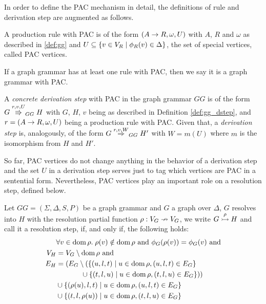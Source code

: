 \documentclass[]{report}
\begin{document}
In order to define the PAC mechanism in detail, the definitions of rule and derivation step are augmented as follows.

\begin{definition}
	A production rule with PAC is of the form $(A \to R, \omega, U)$ with $A$, $R$ and $\omega$ as described in \ref{def:gg} and $U \subseteq \{v \in V_R \; | \; \phi_R(v) \in \Delta\}$, the set of special vertices, called PAC vertices.
\end{definition}

If a graph grammar has at least one rule with PAC, then we say it is a graph grammar with PAC.

\begin{definition}
	A \textit{concrete derivation step} with PAC in the graph grammar $GG$ is of the form $G \overset{r,v,U}{\Rrightarrow}_{GG} H$ with $G$, $H$, $v$ being as described in Definition \ref{def:gg_dstep}, and $r = (A \to R, \omega, U)$ being a production rule with PAC. Given that, a \textit{derivation step} is, analogously, of the form $G \overset{r,v,W}{\Rightarrow}_{GG} H'$ with $W = m(U)$ where $m$ is the isomorphism from $H$ and $H'$.
\end{definition}

So far, PAC vertices do not change anything in the behavior of a derivation step and the set $U$ in a derivation step serves just to tag which vertices are PAC in a sentential form. Nevertheless, PAC vertices play an important role on a resolution step, defined below.

\begin{definition}
	Let $GG = (\Sigma, \Delta, S, P)$ be a graph grammar and $G$ a graph over $\Delta$, $G$ resolves into $H$ with the resolution partial function $\rho: V_G \nrightarrow V_G$, we write $G \overset{\rho}{\rightarrowtail} H$ and call it a resolution step, if, and only if, the following holds:
	\begin{align*}
		& \forall v \in \operatorname{dom} \rho . \; \rho(v) \notin \operatorname{dom} \rho \text{ and } \phi_G(\rho(v)) = \phi_G(v) \text{ and}\\
		V_H & = V_G \setminus \operatorname{dom} \rho \text{ and}\\
		E_H & = (E_G \setminus (\{(u,l,t) \; | \; u \in \operatorname{dom} \rho, (u,l,t) \in E_G\} \\
			&\hspace{3.5em} \cup \{(t,l,u) \; | \; u \in \operatorname{dom} \rho, (t,l,u) \in E_G\}))\\
		    & \cup \{(\rho(u),l,t) \; | \; u \in \operatorname{dom} \rho, (u,l,t) \in E_G\} \\
		    & \cup \{(t,l,\rho(u)) \; | \; u \in \operatorname{dom} \rho, (t,l,u) \in E_G\}
	\end{align*}
\end{definition}
\end{document}
